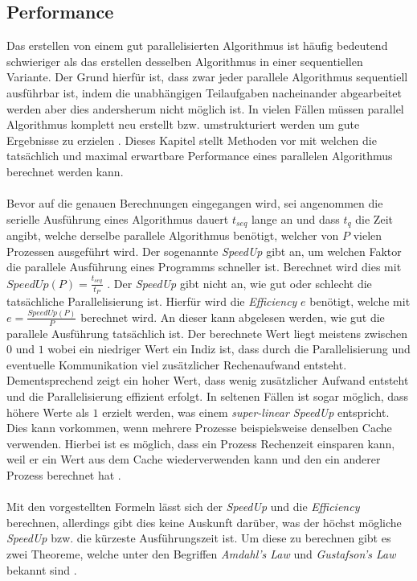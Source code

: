 \subsection{Performance}
Das erstellen von einem gut parallelisierten Algorithmus ist häufig bedeutend schwieriger als das erstellen desselben Algorithmus in einer sequentiellen Variante. Der Grund hierfür ist, dass zwar jeder parallele Algorithmus sequentiell ausführbar ist, indem die unabhängigen Teilaufgaben nacheinander abgearbeitet werden aber dies andersherum nicht möglich ist. In vielen Fällen müssen parallel Algorithmus komplett neu erstellt bzw. umstrukturiert werden um gute Ergebnisse zu erzielen \cite{nielsen2016introduction}. Dieses Kapitel stellt Methoden vor mit welchen die tatsächlich und maximal erwartbare Performance eines parallelen Algorithmus berechnet werden kann. 
\\\\
Bevor auf die genauen Berechnungen eingegangen wird, sei angenommen die serielle Ausführung eines Algorithmus dauert  $t_{seq}$ lange an und dass $t_q$ die Zeit angibt, welche derselbe parallele Algorithmus benötigt, welcher von $P$ vielen Prozessen ausgeführt wird. Der sogenannte \emph{SpeedUp} gibt an, um welchen Faktor die parallele Ausführung eines Programms schneller ist. Berechnet wird dies mit $SpeedUp(P)=\frac{t_{seq}}{t_P}$ \cite{nielsen2016introduction}. Der \emph{SpeedUp} gibt nicht an, wie gut oder schlecht die tatsächliche Parallelisierung ist. Hierfür wird die \emph{Efficiency} $e$ benötigt, welche mit $e=\frac{SpeedUp(P)}{P}$ berechnet wird. An dieser kann abgelesen werden, wie gut die parallele Ausführung tatsächlich ist. Der berechnete Wert liegt meistens zwischen $0$ und $1$ wobei ein niedriger Wert ein Indiz ist, dass durch die Parallelisierung und eventuelle Kommunikation viel zusätzlicher Rechenaufwand entsteht. Dementsprechend zeigt ein hoher Wert, dass wenig zusätzlicher Aufwand entsteht und die Parallelisierung effizient erfolgt. In seltenen Fällen ist sogar möglich, dass höhere Werte als $1$ erzielt werden, was einem \emph{super-linear SpeedUp} entspricht. Dies kann vorkommen, wenn mehrere Prozesse beispielsweise denselben Cache verwenden. Hierbei ist es möglich, dass ein Prozess Rechenzeit einsparen kann, weil er ein Wert aus dem Cache wiederverwenden kann und den ein anderer Prozess berechnet hat \cite{nielsen2016introduction}.
\\\\
Mit den vorgestellten Formeln lässt sich der \emph{SpeedUp} und die \emph{Efficiency} berechnen, allerdings gibt dies keine Auskunft darüber, was der höchst mögliche \emph{SpeedUp} bzw. die kürzeste Ausführungszeit ist. Um diese zu berechnen gibt es zwei Theoreme, welche unter den Begriffen \emph{Amdahl's Law} und \emph{Gustafson's Law} bekannt sind \cite{nielsen2016introduction}. 
